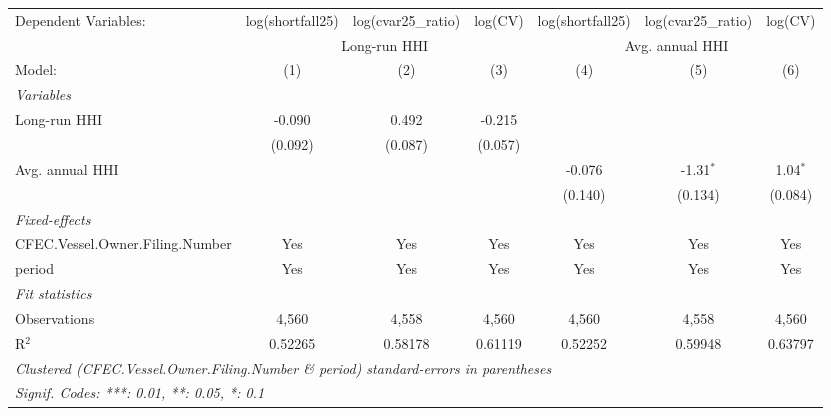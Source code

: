 \begingroup \centering \begin{tabular}{lcccccc}    \tabularnewline \midrule \midrule    Dependent Variables:            & log(shortfall25) & log(cvar25\_ratio)  & log(CV) & log(shortfall25) & log(cvar25\_ratio)  & log(CV)\\       & \multicolumn{3}{c}{Long-run HHI} & \multicolumn{3}{c}{Avg. annual HHI} \\     Model:                          & (1)              & (2)                 & (3)     & (4)              & (5)                 & (6)\\      \midrule    \emph{Variables}\\    Long-run HHI                    & -0.090           & 0.492               & -0.215  &                  &                     &   \\                                       & (0.092)          & (0.087)             & (0.057) &                  &                     &   \\       Avg. annual HHI                 &                  &                     &         & -0.076           & -1.31$^{*}$         & 1.04$^{*}$\\                                       &                  &                     &         & (0.140)          & (0.134)             & (0.084)\\       \midrule    \emph{Fixed-effects}\\    CFEC.Vessel.Owner.Filing.Number & Yes              & Yes                 & Yes     & Yes              & Yes                 & Yes\\      period                          & Yes              & Yes                 & Yes     & Yes              & Yes                 & Yes\\      \midrule    \emph{Fit statistics}\\    Observations                    & 4,560            & 4,558               & 4,560   & 4,560            & 4,558               & 4,560\\      R$^2$                           & 0.52265          & 0.58178             & 0.61119 & 0.52252          & 0.59948             & 0.63797\\      \midrule \midrule    \multicolumn{7}{l}{\emph{Clustered (CFEC.Vessel.Owner.Filing.Number \& period) standard-errors in parentheses}}\\    \multicolumn{7}{l}{\emph{Signif. Codes: ***: 0.01, **: 0.05, *: 0.1}}\\ \end{tabular} \par\endgroup